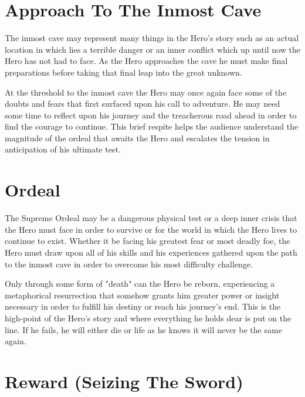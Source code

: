 \documentclass[oneside]{book}
\begin{document}
\newpage

\chapter{Approach To The Inmost Cave}

The inmost cave may represent many things in the Hero's story such as an actual location in which lies a terrible danger or an inner conflict which up until now the Hero has not had to face. As the Hero approaches the cave he must make final preparations before taking that final leap into the great unknown.

At the threshold to the inmost cave the Hero may once again face some of the doubts and fears that first surfaced upon his call to adventure. He may need some time to reflect upon his journey and the treacherous road ahead in order to find the courage to continue. This brief respite helps the audience understand the magnitude of the ordeal that awaits the Hero and escalates the tension in anticipation of his ultimate test.



\newpage

\chapter{Ordeal}

The Supreme Ordeal may be a dangerous physical test or a deep inner crisis that the Hero must face in order to survive or for the world in which the Hero lives to continue to exist. Whether it be facing his greatest fear or most deadly foe, the Hero must draw upon all of his skills and his experiences gathered upon the path to the inmost cave in order to overcome his most difficulty challenge.

Only through some form of "death" can the Hero be reborn, experiencing a metaphorical resurrection that somehow grants him greater power or insight necessary in order to fulfill his destiny or reach his journey's end. This is the high-point of the Hero's story and where everything he holds dear is put on the line. If he fails, he will either die or life as he knows it will never be the same again.



\newpage

\chapter{Reward (Seizing The Sword)}
\end{document}
